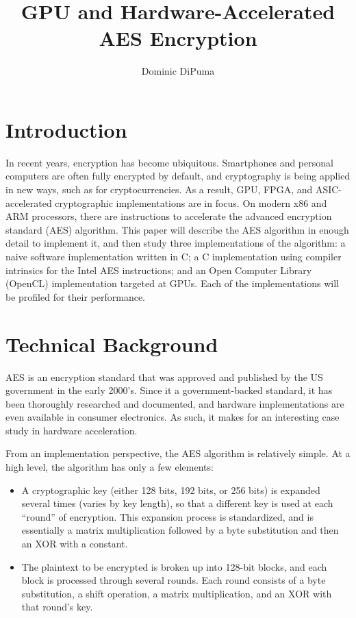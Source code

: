 \documentclass[a4paper,10pt,conference]{IEEEtran}
\title{GPU and Hardware-Accelerated AES Encryption}
\author{Dominic DiPuma}
\begin{document}
\maketitle

\section{Introduction}

In recent years, encryption has become ubiquitous.  Smartphones and personal computers are often fully encrypted by default, and cryptography is being applied in new ways, such as for cryptocurrencies.  As a result, GPU, FPGA, and ASIC-accelerated cryptographic implementations are in focus.  On modern x86 and ARM processors, there are instructions to accelerate the advanced encryption standard (AES) algorithm.  This paper will describe the AES algorithm in enough detail to implement it, and then study three implementations of the algorithm: a naive software implementation written in C; a C implementation using compiler intrinsics for the Intel AES instructions; and an Open Computer Library (OpenCL) implementation targeted at GPUs.  Each of the implementations will be profiled for their performance.

\section{Technical Background}

AES is an encryption standard that was approved and published by the US government in the early 2000's.  Since it a government-backed standard, it has been thoroughly researched and documented, and hardware implementations are even available in consumer electronics.  As such, it makes for an interesting case study in hardware acceleration.

From an implementation perspective, the AES algorithm is relatively simple.  At a high level, the algorithm has only a few elements:
\begin{itemize}
 \item A cryptographic key (either 128 bits, 192 bits, or 256 bits) is expanded several times (varies by key length), so that a different key is used at each ``round'' of encryption.  This expansion process is standardized, and is essentially a matrix multiplication followed by a byte substitution and then an XOR with a constant.
 \item The plaintext to be encrypted is broken up into 128-bit blocks, and each block is processed through several rounds.  Each round consists of a byte substitution, a shift operation, a matrix multiplication, and an XOR with that round's key.
\end{itemize}
\end{document}
